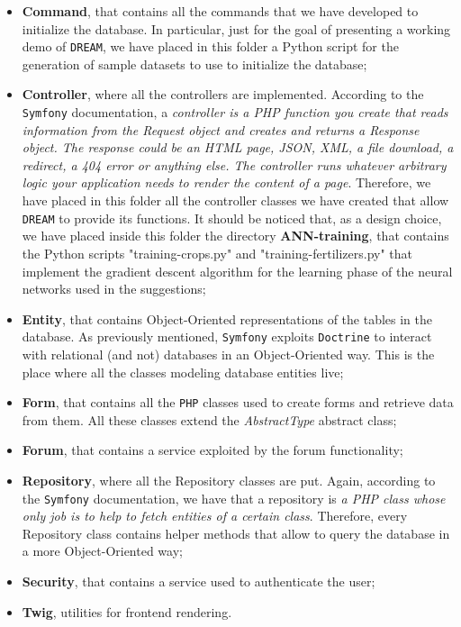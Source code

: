 \documentclass{article}
\begin{document}
\begin{itemize}
    \item \textbf{Command}, that contains all the commands that we have developed to initialize the database. In particular, just for the goal of presenting a working demo of \verb|DREAM|, we have placed in this folder a Python script for the generation of sample datasets to use to initialize the database;
    \item \textbf{Controller}, where all the controllers are implemented. According to the \verb|Symfony| documentation, a \textit{controller is a PHP function you create that reads information from the Request object and creates and returns a Response object. The response could be an HTML page, JSON, XML, a file download, a redirect, a 404 error or anything else. The controller runs whatever arbitrary logic your application needs to render the content of a page}. Therefore, we have placed in this folder all the controller classes we have created that allow \verb|DREAM| to provide its functions. It should be noticed that, as a design choice, we have placed inside this folder the directory \textbf{ANN-training}, that contains the Python scripts "training-crops.py" and "training-fertilizers.py" that implement the gradient descent algorithm for the learning phase of the neural networks used in the suggestions;
    \item \textbf{Entity}, that contains Object-Oriented representations of the tables in the database. As previously mentioned, \verb|Symfony| exploits \verb|Doctrine| to interact with relational (and not) databases in an Object-Oriented way. This is the place where all the classes modeling database entities live;
    \item \textbf{Form}, that contains all the \verb|PHP| classes used to create forms and retrieve data from them. All these classes extend the \textit{AbstractType} abstract class;
    \item \textbf{Forum}, that contains a service exploited by the forum functionality;
    \item \textbf{Repository}, where all the Repository classes are put. Again, according to the \verb|Symfony| documentation, we have that a repository is \textit{a PHP class whose only job is to help to fetch entities of a certain class}. Therefore, every Repository class contains helper methods that allow to query the database in a more Object-Oriented way;
    \item \textbf{Security}, that contains a service used to authenticate the user;
    \item \textbf{Twig}, utilities for frontend rendering.
\end{itemize}
\newpage
\end{document}
